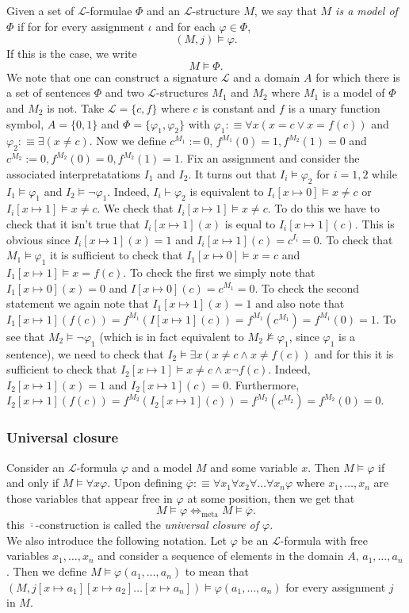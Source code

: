 Given a set of $\mathcal{L}$-formulae $\Phi$ and an $\mathcal{L}$-structure $M$, we say that \emph{$M$ is a model of $\Phi$} if for for every assignment $\iota$ and for each $\varphi\in \Phi$, 
$$(M,j) \vDash \varphi.$$
If this is the case, we write 
$$M\vDash \Phi.$$
We note that one can construct a signature $\mathcal{L}$ and a domain $A$ for which there is a set of sentences $\Phi$ and two $\mathcal{L}$-structures $M_1$ and $M_2$ where $M_1$ is a model of $\Phi$ and $M_2$ is not. Take $\mathcal{L}=\{c,f\}$ where $c$ is constant and $f$ is a unary function symbol, $A=\{0,1\}$ and $\Phi = \{\varphi_1,\varphi_2\}$ with $\varphi_1 :\equiv\forall x(x=c\vee x=f(c))$ and $\varphi_2:\equiv \exists(x\neq c)$. Now we define $c^{M_1} :=0$, $f^{M_1}(0)=1, f^{M_2}(1)=0$ and $c^{M_2}:=0, f^{M_2}(0)=0,f^{M_2}(1)=1$. Fix an assignment and consider the associated interpretatations $I_1$ and $I_2$. It turns out that $I_i\vDash \varphi_2$ for $i=1,2$ while $I_1 \vDash\varphi_1$ and $I_2\vDash \neg\varphi_1$. Indeed, $I_i\vdash \varphi_2$ is equivalent to $I_i[x\mapsto 0] \vDash x\neq c$ or $I_i[x\mapsto 1] \vDash x\neq c$. We check that $I_i[x\mapsto 1] \vDash x\neq c$. To do this we have to check that it isn't true that $I_i[x\mapsto 1](x)$ is equal to $I_i[x\mapsto 1](c)$. This is obvious since $I_i[x\mapsto 1](x)=1$ and $I_i[x\mapsto 1](c)=c^{I_i}=0$. To check that $M_1\vDash \varphi_1$ it is sufficient to check that $I_1[x\mapsto 0] \vDash x=c$ and $I_1[x\mapsto 1]\vDash x = f(c)$. To check the first we simply note that $I_1[x\mapsto 0](x)=0$ and $I[x\mapsto 0](c)=c^{M_1}=0$. To check the second statement we again note that $I_1[x\mapsto1](x)=1$ and also note that $I_1[x\mapsto 1](f(c))=f^{M_1}(I[x\mapsto 1](c))=f^{M_1}(c^{M_1})=f^{M_1}(0)= 1$. To see that $M_2\vDash \neg \varphi_1$ (which is in fact equivalent to $M_2\not\vDash \varphi_1$, since $\varphi_1$ is a sentence), we need to check that $I_2 \vDash \exists x(x\neq c \wedge x\neq f(c))$ and for this it is sufficient to check that $I_2[x\mapsto 1]\vDash x\neq c \wedge x\neg f(c)$. Indeed, $I_2[x\mapsto 1](x)=1$ and $I_2[x\mapsto 1](c) =0$. Furthermore, $I_2[x\mapsto 1](f(c))=f^{M_2}(I_2[x\mapsto 1](c))=f^{M_2}(c^{M_2})=f^{M_2}(0)=0$.
\subsubsection{Universal closure}
Consider an $\mathcal{L}$-formula $\varphi$ and a model $M$ and some variable $x$. Then $M\vDash \varphi$ if and only if $M\vDash \forall x \varphi$. Upon defining $\overline{\varphi}:\equiv \forall x_1\forall x_2\forall \dots \forall x_n \varphi$ where $x_1,\dots,x_n$ are those variables that appear free in $\varphi$ at some position, then we get that $$M\vDash \varphi \iff_{\mathrm{meta}} M\vDash \overline{\varphi}.$$
this $\overline{\cdot}$-construction is called the \emph{universal closure of $\varphi$}.\\
We also introduce the following notation. Let $\varphi$ be an $\mathcal{L}$-formula with free variables $x_1,\dots,x_n$ and consider a sequence of elements in the domain $A$, $a_1,\dots,a_n$. Then we define $M\vDash \varphi(a_1,\dots,a_n)$ to mean that $(M,j [x\mapsto a_1][x\mapsto a_2]\dots[x\mapsto a_n]) \vDash \varphi(a_1,\dots,a_n)$ for every assignment $j$ in $M$.\\
